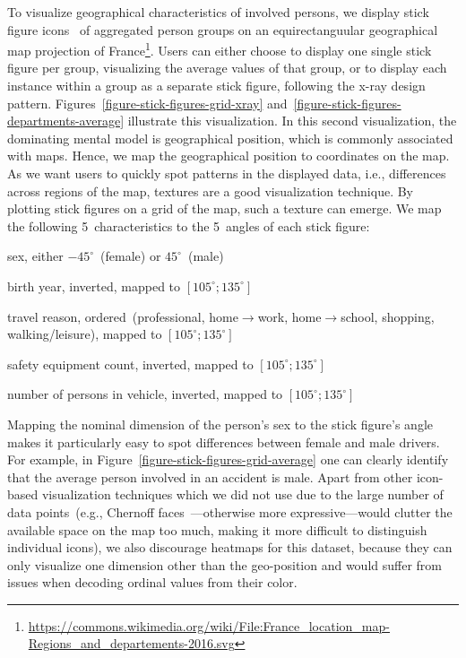 To visualize geographical characteristics of involved persons, we display stick figure icons~\cite{PickettG1988} of aggregated person groups on an equirectanguular geographical map projection of France\footnote{\url{https://commons.wikimedia.org/wiki/File:France_location_map-Regions_and_departements-2016.svg}}.
Users can either choose to display one single stick figure per group, visualizing the average values of that group, or to display each instance within a group as a separate stick figure, following the x-ray design pattern.
Figures~\ref{figure-stick-figures-grid-xray} and~\ref{figure-stick-figures-departments-average} illustrate this visualization.
In this second visualization, the dominating mental model is geographical position, which is commonly associated with maps. Hence, we map the geographical position to coordinates on the map. As we want users to quickly spot patterns in the displayed data, i.e., differences across regions of the map, textures are a good visualization technique.
By plotting stick figures on a grid of the map, such a texture can emerge. We map the following 5~characteristics to the 5~angles of each stick figure:
\begin{description}
    \setlength{\itemsep}{1pt}
    \item[\(\alpha\)] sex, either \(-45^\circ\)~(female) or \(45^\circ\)~(male)
    \item[\(\beta\)] birth year, inverted, mapped to  \([105^\circ; 135^\circ]\)
    \item[\(\gamma\)] travel reason, ordered~(professional, home\(\to\)work, home\(\to\)school, shopping, walking/leisure), mapped to  \([105^\circ; 135^\circ]\)
    \item[\(\delta\)] safety equipment count, inverted, mapped to  \([105^\circ; 135^\circ]\)
    \item[\(\epsilon\)] number of persons in vehicle, inverted, mapped to  \([105^\circ; 135^\circ]\)
\end{description}
Mapping the nominal dimension of the person's sex to the stick figure's angle makes it particularly easy to spot differences between female and male drivers. For example, in Figure~\ref{figure-stick-figures-grid-average} one can clearly identify that the average person involved in an accident is male.
Apart from other icon-based visualization techniques which we did not use due to the large number of data points~(e.g., Chernoff faces~\cite{Chernoff1973}---otherwise more expressive---would clutter the available space on the map too much, making it more difficult to distinguish individual icons), we also discourage heatmaps for this dataset, because they can only visualize one dimension other than the geo-position and would suffer from issues when decoding ordinal values from their color.

